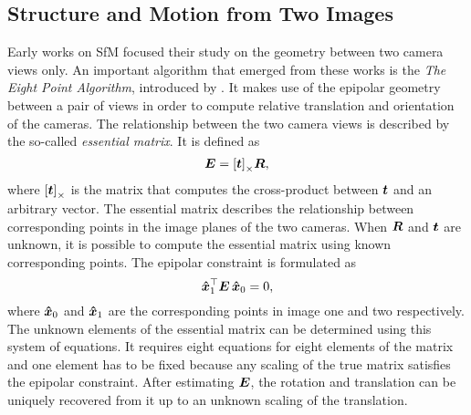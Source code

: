 		\subsection{Structure and Motion from Two Images}
			Early works on SfM focused their study on the geometry between two camera views only.
			An important algorithm that emerged from these works is the \emph{The Eight Point Algorithm}, introduced by \cite{longuet1981}.
			It makes use of the epipolar geometry between a pair of views in order to compute relative translation and orientation of the cameras.
			The relationship between the two camera views is described by the so-called \emph{essential matrix}.
			It is defined as 
			\begin{equation}\label{eq:essential_matrix}
				\bm{E} = \left[ \bm{t} \right]_\times \! \bm{R},
			\end{equation}
			where $\left[ \bm{t} \right]_\times$ is the matrix that computes the cross-product between $\bm{t}$ and an arbitrary vector.
			The essential matrix describes the relationship between corresponding points in the image planes of the two cameras.
			When $\bm{R}$ and $\bm{t}$ are unknown, it is possible to compute the essential matrix using known corresponding points.
			The epipolar constraint is formulated as 
			\begin{equation}\label{eq:epipolar_constraint}
				\bm{\hat{x}}_1^\top \bm{E} \, \bm{\hat{x}}_0 = 0,
			\end{equation}
			where $\bm{\hat{x}}_0$ and $\bm{\hat{x}}_1$ are the corresponding points in image one and two respectively.
			The unknown elements of the essential matrix can be determined using this system of equations.
			It requires eight equations for eight elements of the matrix and one element has to be fixed because any scaling of the true matrix satisfies the epipolar constraint.
			After estimating $\bm{E}$, the rotation and translation can be uniquely recovered from it up to an unknown scaling of the translation.
			
